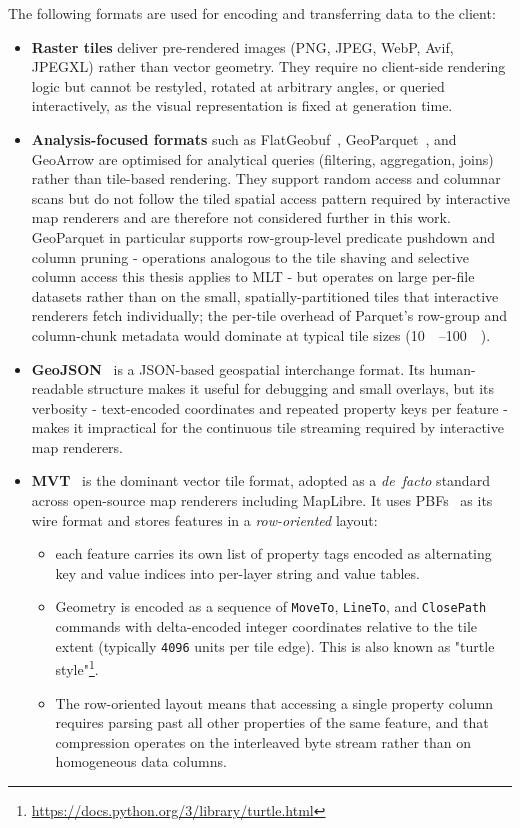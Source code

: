 The following formats are used for encoding and transferring data to the client:

\begin{itemize}
    \item \textbf{Raster tiles} deliver pre-rendered images (PNG, JPEG, WebP, Avif, JPEGXL) rather than vector geometry.
    They require no client-side rendering logic but cannot be restyled, rotated at arbitrary angles, or queried interactively, as the visual representation is fixed at generation time.

    \item \textbf{Analysis-focused formats} such as FlatGeobuf~\cite{flatgeobuf2018}, GeoParquet~\cite{geoparquetSpec2024}, and GeoArrow are optimised for analytical queries (filtering, aggregation, joins) rather than tile-based rendering.
    They support random access and columnar scans but do not follow the tiled spatial access pattern required by interactive map renderers and are therefore not considered further in this work.
    GeoParquet in particular supports row-group-level predicate pushdown and column pruning - operations analogous to the tile shaving and selective column access this thesis applies to \ac{MLT} - but operates on large per-file datasets rather than on the small, spatially-partitioned tiles that interactive renderers fetch individually; the per-tile overhead of Parquet's row-group and column-chunk metadata would dominate at typical tile sizes (\qtyrange{10}{100}{\kilo\byte}).

    \item \textbf{GeoJSON}~\cite{butlerGeoJSONFormat2016} is a JSON-based geospatial interchange format.
    Its human-readable structure makes it useful for debugging and small overlays, but its verbosity - text-encoded coordinates and repeated property keys per feature - makes it impractical for the continuous tile streaming required by interactive map renderers.

    \item \textbf{\acf{MVT}}~\cite{Vectortilespec21Master} is the dominant vector tile format, adopted as a \emph{de~facto} standard across open-source map renderers including MapLibre.
    It uses \acp{PBF}~\cite{ProtocolBuffers} as its wire format and stores features in a \emph{row-oriented} layout:
\begin{itemize}
    \item each feature carries its own list of property tags encoded as alternating key and value indices into per-layer string and value tables.
    \item Geometry is encoded as a sequence of \texttt{MoveTo}, \texttt{LineTo}, and \texttt{ClosePath} commands with delta-encoded integer coordinates relative to the tile extent (typically \texttt{4096} units per tile edge).
    This is also known as "turtle style"\footnote{\url{https://docs.python.org/3/library/turtle.html}}.
    \item The row-oriented layout means that accessing a single property column requires parsing past all other properties of the same feature, and that compression operates on the interleaved byte stream rather than on homogeneous data columns.
\end{itemize}



\end{itemize}
